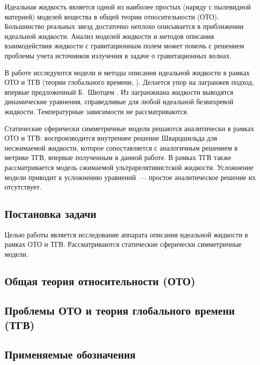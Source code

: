 \documentclass[\docroot/reports/draft/report.tex]{subfiles}
\begin{document}
\onlyinsubfile{\tableofcontents}

Идеальная жидкость является одной из наиболее простых (наряду с пылевидной материей) моделей вещества в общей теории относительности (ОТО). Большинство реальных звезд достаточно неплохо описывается в приближении идеальной жидкости. Анализ моделей жидкости и методов описания взаимодействия жидкости с гравитационным полем может помочь с решением проблемы учета источников излучения в задаче о гравитационных волнах.

В работе исследуются модели и методы описания идеальной жидкости в рамках ОТО и ТГВ (теории глобального времени, \cite{burlankov_space_dynamics,burlankov_grav_waves,burlankov_new_phys}). Делается упор на лагранжев подход, впервые предложенный Б.~Шютцем \cite{schutz_vel_pot}. Из лагранжиана жидкости выводятся динамические уравнения, справедливые для любой идеальной безвихревой жидкости. Температурные зависимости не рассматриваются.

Статические сферически симметричные модели решаются аналитически в рамках ОТО и ТГВ: воспроизводится внутреннее решение Шварцшильда для несжимаемой жидкости, которое сопоставляется с аналогичным решением в метрике ТГВ, впервые полученным в данной работе. В рамках ТГВ также рассматривается модель сжимаемой ультрарелятивистской жидкости. Усложнение модели приводит к усложнению уравнений~--- простое аналитическое решение их отсутствует.

\subsection{Постановка задачи}

Целью работы является исследование аппарата описания идеальной жидкости в рамках ОТО и ТГВ. Рассматриваются статические сферически симметричные модели.

\subsection{Общая теория относительности (ОТО)}


\subsection{Проблемы ОТО и теория глобального времени (ТГВ)}


\subsection{Применяемые обозначения}


\end{document}
